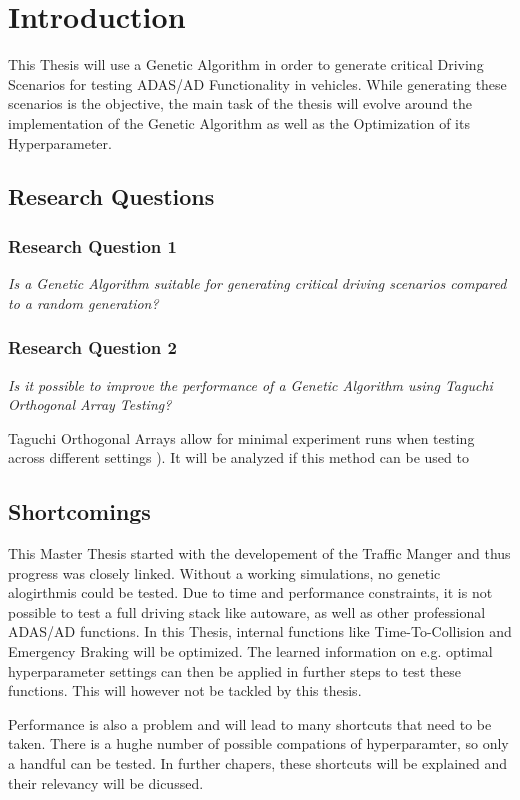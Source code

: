 \chapter{Introduction}


This Thesis will use a Genetic Algorithm in order to generate critical Driving Scenarios for testing ADAS/AD Functionality in vehicles.
While generating these scenarios is the objective, the main task of the thesis will evolve around the implementation of the Genetic Algorithm as well as the Optimization of its Hyperparameter.


\section{Research Questions}
\subsection{Research Question 1}
\textit{Is a Genetic Algorithm suitable for generating critical driving scenarios compared to a random generation?}

\subsection{Research Question 2}
\textit{Is it possible to improve the performance of a Genetic Algorithm using Taguchi Orthogonal Array Testing?}

Taguchi Orthogonal Arrays allow for minimal experiment runs when testing across different settings \cite{roy_primer_1990}). It will be analyzed if this method can be used to 


\section{Shortcomings}
This Master Thesis started with the developement of the Traffic Manger and thus progress was closely linked. Without a working simulations, no genetic alogirthmis could be tested. Due to time and performance constraints, it is not possible to test a full driving stack like autoware, as well as other professional ADAS/AD functions.
In this Thesis, internal functions like Time-To-Collision and Emergency Braking will be optimized. The learned  information on e.g. optimal hyperparameter settings can then be applied in further steps to test these functions. This will however not be tackled by this thesis.

Performance is also a problem and will lead to many shortcuts that need to be taken. There is a hughe number of possible compations of hyperparamter, so only a handful can be tested. In further chapers, these shortcuts will be explained and their relevancy will be dicussed.

